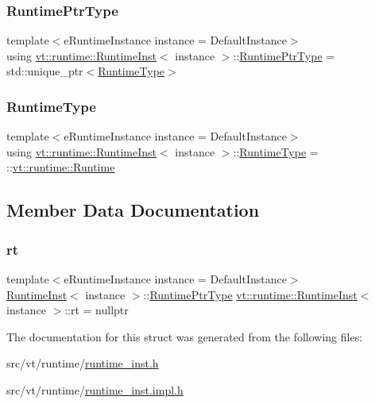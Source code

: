 \subsubsection{\texorpdfstring{Runtime\+Ptr\+Type}{RuntimePtrType}}
{\footnotesize\ttfamily template$<$e\+Runtime\+Instance instance = Default\+Instance$>$ \\
using \hyperlink{structvt_1_1runtime_1_1_runtime_inst}{vt\+::runtime\+::\+Runtime\+Inst}$<$ instance $>$\+::\hyperlink{structvt_1_1runtime_1_1_runtime_inst_aebff925fed3f868dfab2dc86089d80c9}{Runtime\+Ptr\+Type} =  std\+::unique\+\_\+ptr$<$\hyperlink{structvt_1_1runtime_1_1_runtime_inst_a60483df7bc2ed636e7838961c7c6c28a}{Runtime\+Type}$>$}

\mbox{\label{structvt_1_1runtime_1_1_runtime_inst_a60483df7bc2ed636e7838961c7c6c28a}} 
\subsubsection{\texorpdfstring{Runtime\+Type}{RuntimeType}}
{\footnotesize\ttfamily template$<$e\+Runtime\+Instance instance = Default\+Instance$>$ \\
using \hyperlink{structvt_1_1runtime_1_1_runtime_inst}{vt\+::runtime\+::\+Runtime\+Inst}$<$ instance $>$\+::\hyperlink{structvt_1_1runtime_1_1_runtime_inst_a60483df7bc2ed636e7838961c7c6c28a}{Runtime\+Type} =  \+::\hyperlink{structvt_1_1runtime_1_1_runtime}{vt\+::runtime\+::\+Runtime}}



\subsection{Member Data Documentation}
\mbox{\label{structvt_1_1runtime_1_1_runtime_inst_a19ed3095efba69b6ab453eb9129eafd0}} 
\subsubsection{\texorpdfstring{rt}{rt}}
{\footnotesize\ttfamily template$<$e\+Runtime\+Instance instance = Default\+Instance$>$ \\
\hyperlink{structvt_1_1runtime_1_1_runtime_inst}{Runtime\+Inst}$<$ instance $>$\+::\hyperlink{structvt_1_1runtime_1_1_runtime_inst_aebff925fed3f868dfab2dc86089d80c9}{Runtime\+Ptr\+Type} \hyperlink{structvt_1_1runtime_1_1_runtime_inst}{vt\+::runtime\+::\+Runtime\+Inst}$<$ instance $>$\+::rt = nullptr\hspace{0.3cm}{\ttfamily [static]}}



The documentation for this struct was generated from the following files\+:\begin{DoxyCompactItemize}
\item 
src/vt/runtime/\hyperlink{runtime__inst_8h}{runtime\+\_\+inst.\+h}\item 
src/vt/runtime/\hyperlink{runtime__inst_8impl_8h}{runtime\+\_\+inst.\+impl.\+h}\end{DoxyCompactItemize}
